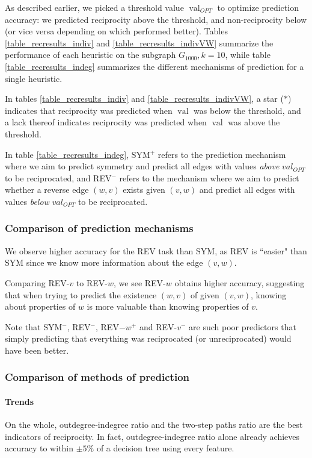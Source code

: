 \documentclass[conference]{IEEEtran}
\begin{document}
As described earlier, we picked a threshold value $\operatorname{val}_{OPT}$ to optimize prediction accuracy: we predicted reciprocity above the threshold, and non-reciprocity below (or vice versa depending on which performed better). 
Tables \ref{table_recresults_indiv} and \ref{table_recresults_indivVW} summarize the performance of each heuristic on the subgraph $G_{1000}, k=10$, while 
table \ref{table_recresults_indeg} summarizes the different mechanisms of prediction for a single heuristic.

In tables \ref{table_recresults_indiv} and \ref{table_recresults_indivVW}, a star ($*$) indicates that reciprocity was predicted when $\operatorname{val}$ was below the threshold, and a lack thereof indicates reciprocity was predicted when $\operatorname{val}$ was above the threshold.

In table \ref{table_recresults_indeg}, SYM$^+$ refers to the prediction mechanism where we aim to predict symmetry and predict all edges with values \emph{above} $val_{OPT}$ to be reciprocated, and REV$^-$ refers to the mechanism where we aim to predict whether a reverse edge $(w,v)$ exists given $(v,w)$ and predict all edges with values \emph{below} $val_{OPT}$ to be reciprocated. 

\subsubsection{Comparison of prediction mechanisms}
We observe higher accuracy for the REV task than SYM, as REV is ``easier" than SYM 
since we know more information about the edge $(v,w)$.

Comparing REV-$v$ to REV-$w$, we see REV-$w$ obtains higher accuracy, suggesting that when trying to predict the existence $(w,v)$ of given $(v,w)$, knowing about properties of $w$ is more valuable than knowing properties of $v$.

Note that SYM$^-$, REV$^-$, REV$-w^+$ and REV-$v^-$ are such poor predictors that simply predicting that everything was reciprocated (or unreciprocated) would have been better.

\subsubsection{Comparison of methods of prediction}

\paragraph{Trends}
On the whole, outdegree-indegree ratio and the two-step paths ratio are the best indicators of reciprocity. 
In fact, outdegree-indegree ratio alone already achieves accuracy to within $\pm 5\%$ of a decision tree using every feature.
\end{document}
